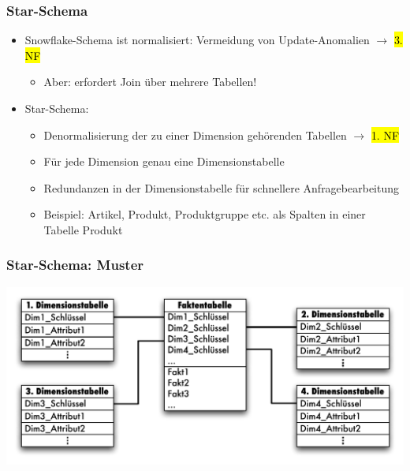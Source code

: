         
            \begin{frame}
        
            \frametitle{Star-Schema}
        
            \begin{itemize}
            \item Snowflake-Schema ist normalisiert: Vermeidung von
              Update-Anomalien $\to$ \hl{3. NF}
              \begin{itemize}
              \item Aber: erfordert Join über mehrere Tabellen!
              \end{itemize}
            \item Star-Schema:
              \begin{itemize}
              \item Denormalisierung der zu einer Dimension gehörenden Tabellen $\to$ \hl{1. NF}
              \item Für jede Dimension genau eine Dimensionstabelle
              \item Redundanzen in der Dimensionstabelle für schnellere
                Anfragebearbeitung
              \item Beispiel: Artikel, Produkt, Produktgruppe etc. als Spalten in
                einer Tabelle Produkt
              \end{itemize}
            \end{itemize}
        
            \end{frame}
        
        
            \begin{frame}
        
            \frametitle{Star-Schema: Muster}
        
            \begin{center}
              \includegraphics[scale=.6]{fig6/StarSchema.pdf}
            \end{center}
        
            \end{frame}
        
